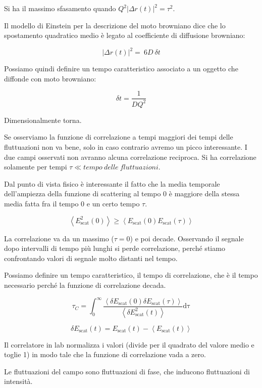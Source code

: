 Si ha il massimo sfasamento quando
\(Q^{2}\left| \Delta r\left( t \right) \right|^{2} = \tau^{2}\).

Il modello di Einstein per la descrizione del moto browniano dice che lo
spostamento quadratico medio è legato al coefficiente di diffusione
browniano:

\[\left| \Delta r\left( t \right) \right|^{2} = \ 6D\ \delta t\]

Possiamo quindi definire un tempo caratteristico associato a un oggetto
che diffonde con moto browniano:

\[\delta t = \frac{1}{DQ^{2}}\]

Dimensionalmente torna.

Se osserviamo la funzione di correlazione a tempi maggiori dei tempi
delle fluttuazioni non va bene, solo in caso contrario avremo un picco
interessante. I due campi osservati non avranno alcuna correlazione
reciproca. Si ha correlazione solamente per tempi
\(\tau \ll tempo\ delle\ fluttuazioni\).

Dal punto di vista fisico è interessante il fatto che la media temporale
dell'ampiezza della funzione di scattering al tempo 0 è maggiore della
stessa media fatta fra il tempo 0 e un certo tempo \(\tau\).

\[\left\langle E_{\text{scat}}^{2}\left( 0 \right) \right\rangle \geq \left\langle E_{\text{scat}}\left( 0 \right)E_{\text{scat}}\left( \tau \right) \right\rangle\]

La correlazione va da un massimo (\(\tau = 0\)) e poi decade. Osservando
il segnale dopo intervalli di tempo più lunghi si perde correlazione,
perché stiamo confrontando valori di segnale molto distanti nel tempo.

Possiamo definire un tempo caratteristico, il tempo di correlazione, che
è il tempo necessario perché la funzione di correlazione decada.

\[\tau_{C} = \int_{0}^{\infty}{\frac{\left\langle \delta E_{\text{scat}}\left( 0 \right)\delta E_{\text{scat}}\left( \tau \right) \right\rangle}{\left\langle \delta E_{\text{scat}}^{2}\left( t \right) \right\rangle}\text{dτ}}\]

\[\delta E_{\text{scat}}\left( t \right) = E_{\text{scat}}\left( t \right) - \left\langle E_{\text{scat}}\left( t \right) \right\rangle\]

Il correlatore in lab normalizza i valori (divide per il quadrato del
valore medio e toglie 1) in modo tale che la funzione di correlazione
vada a zero.

Le fluttuazioni del campo sono fluttuazioni di fase, che inducono
fluttuazioni di intensità.


